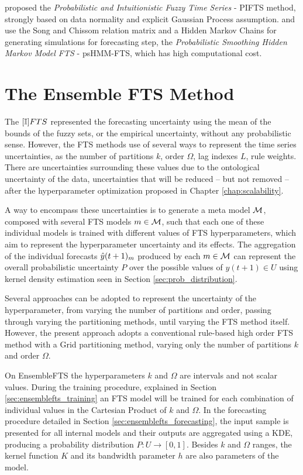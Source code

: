  \cite{Gangwar2014} proposed the \textit{Probabilistic and Intuitionistic Fuzzy Time Series} - PIFTS method, strongly based on data normality and explicit Gaussian Process assumption. \cite{Cheng2012} and \cite{Chuang2014} use the Song and Chissom relation matrix and a Hidden Markov Chains for generating simulations for forecasting step, the \textit{Probabilistic Smoothing Hidden Markov Model FTS} - psHMM-FTS, which has high computational cost.

%
\section{The Ensemble FTS Method}
\label{sec:ensemblefts}

The $[\mathbb{I}]FTS$ represented the forecasting uncertainty using the mean of the bounds of the fuzzy sets, or the empirical uncertainty, without any probabilistic sense. However, the FTS methods use of several ways to represent the time series uncertainties, as the number of partitions $k$, order $\Omega$, lag indexes $L$, rule weights. There are uncertainties surrounding these values due to the ontological uncertainty of the data, uncertainties that will be reduced -- but not removed -- after the hyperparameter optimization  proposed in Chapter \ref{chap:scalability}.

A way to encompass these uncertainties is to generate a meta model $\mathcal{M}$, composed with several FTS models $m \in \mathcal{M}$, such that each one of these individual models is trained with different values of FTS hyperparameters, which aim to represent the hyperparameter uncertainty and its effects. The aggregation of the individual forecasts $\hat{y}(t+1)_m$ produced by each $m \in \mathcal{M}$ can represent the overall probabilistic uncertainty $P$ over the possible values of $y(t+1) \in U$ using kernel density estimation seen in Section \ref{sec:prob_distribution}.

Several approaches can be adopted to represent the uncertainty of the hyperparameter, from varying the number of partitions and order, passing through varying the partitioning methods, until varying the FTS method itself. However, the present approach adopts a conventional rule-based high order FTS method with a Grid partitioning method, varying only the number of partitions $k$ and order $\Omega$.

On EnsembleFTS the hyperparameters $k$ and $\Omega$ are intervals and not scalar values. During the training procedure, explained in Section \ref{sec:ensemblefts_training} an FTS model will be trained for each combination of individual values in the Cartesian Product of $k$ and $\Omega$. In the forecasting procedure detailed in Section \ref{sec:ensemblefts_forecasting}, the input sample is presented for all internal models and their outputs are aggregated using a KDE, producing a probability distribution $P:U \rightarrow [0,1]$. Besides $k$ and $\Omega$ ranges, the kernel function $K$ and its bandwidth parameter $h$ are also parameters of the model.

